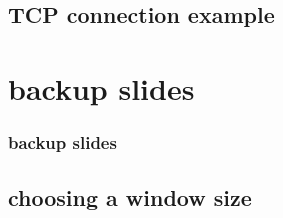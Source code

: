 %

\subsection{TCP connection example}






\section{backup slides}
\begin{frame}\frametitle{backup slides}
\end{frame}
\subsection{choosing a window size}







